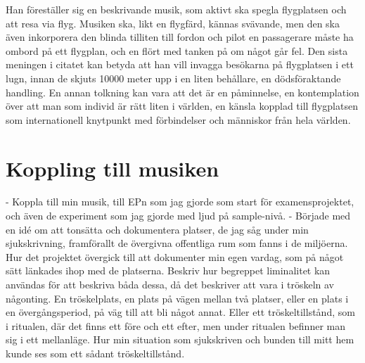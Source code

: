 \documentclass{article}
\begin{document}
Han föreställer sig en beskrivande musik, som aktivt ska spegla flygplatsen och att resa via flyg. Musiken
ska, likt en flygfärd, kännas svävande, men den ska även inkorporera den blinda tilliten till fordon och pilot
en passagerare måste ha ombord på ett flygplan, och en flört med tanken på om något går fel. Den sista meningen i
citatet kan betyda att han vill invagga besökarna på flygplatsen i ett lugn, innan de skjuts 10000 meter upp 
i en liten behållare, en dödsföraktande handling. En annan tolkning kan vara att det är en påminnelse, en
kontemplation över att man som individ är rätt liten i världen, en känsla kopplad till flygplatsen som 
internationell knytpunkt med förbindelser och människor från hela världen. 








\section{Koppling till musiken}
- Koppla till min musik, till EPn som jag gjorde som start för examensprojektet, och även de experiment som
  jag gjorde med ljud på sample-nivå. 
- Började med en idé om att tonsätta och dokumentera platser, de jag såg under min sjukskrivning, framförallt
  de övergivna offentliga rum som fanns i de miljöerna. Hur det projektet övergick till att dokumenter min
  egen vardag, som på något sätt länkades ihop med de platserna. Beskriv hur begreppet
  liminalitet kan användas för att beskriva båda dessa, då det beskriver att vara i
  tröskeln av någonting. En tröskelplats, en plats på vägen mellan två platser, eller en plats i en
  övergångsperiod, på väg till att bli något annat. Eller ett tröskeltillstånd, som i ritualen, där det finns
  ett före och ett efter, men under ritualen befinner man sig i ett mellanläge. Hur min situation som
  sjukskriven och bunden till mitt hem kunde ses som ett sådant tröskeltillstånd.
\end{document}

